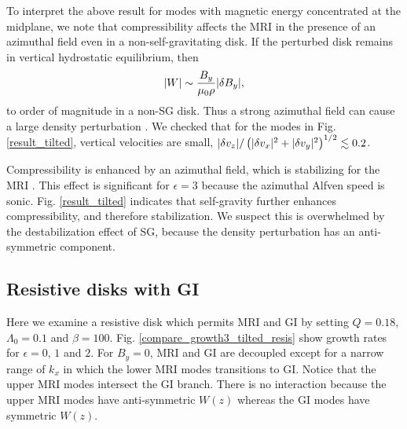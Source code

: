 To interpret the above result for modes with magnetic energy
concentrated at the midplane, we note that compressibility affects the
MRI in the presence of an azimuthal field even in a
non-self-gravitating disk. If the perturbed disk remains in vertical
hydrostatic equilibrium, then  
\begin{align} 
  |W|\sim \frac{B_y}{\mu_0\rho}|\delta B_y|,
\end{align}
to order of magnitude in a non-SG disk. Thus a strong azimuthal field can 
cause a large density perturbation \citep{pessah05}. We checked that
for the modes in Fig. \ref{result_tilted}, vertical velocities are 
small, $|\delta v_z|/\left(|\delta v_x|^2+|\delta v_y|^2\right)^{1/2} \lesssim 0.2$. 

Compressibility is enhanced by an azimuthal field, which is 
stabilizing for the MRI \citep{kim00}. %
This effect is significant for $\epsilon=3$ because the azimuthal
Alfven speed is sonic.      
Fig. \ref{result_tilted} indicates that self-gravity further enhances
compressibility, and therefore stabilization. We suspect this is
overwhelmed by the destabilization effect of SG, because the density
perturbation has an anti-symmetric component.      

\subsection{Resistive disks with GI}
Here we examine a resistive disk which permits MRI and GI by setting $Q=0.18$,
$\Lambda_0=0.1$ and $\beta=100$. 
Fig. \ref{compare_growth3_tilted_resis} show growth rates for
$\epsilon=0,\,1$ and $2$. For $B_y=0$, MRI and GI are decoupled except 
for a narrow range of $k_x$ in which the lower MRI modes transitions to
GI. Notice that the upper MRI modes intersect the GI branch. There is no
interaction because the upper MRI modes have anti-symmetric $W(z)$ whereas
the GI modes have symmetric $W(z)$. 

